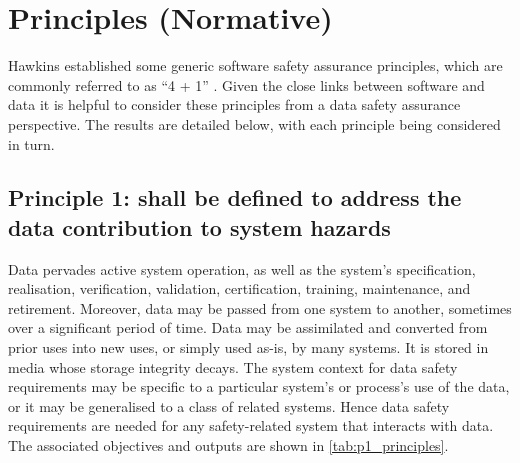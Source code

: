 %
%
\cbstart\chapter{Principles (Normative)} \label{bkm:principlesprocess}\cbend


Hawkins  established some generic software safety assurance principles, which are commonly referred to as ``4 + 1'' \cite{citation:hawkins2013principles}. Given the close links between software and data it is helpful to consider these principles from a data safety assurance perspective. The results are detailed below, with each principle being considered in turn.

\section{Principle 1:  shall be defined to address the data contribution to system hazards}
Data pervades active system operation, as well as the system's specification, realisation, \gls{verification}, \gls{validation}, certification,  training, maintenance, and retirement. Moreover, data may be passed from one system to another, sometimes over a significant period of time. Data may be assimilated and converted from prior uses into new uses, or simply used as-is, by many systems. It is stored in media whose storage \gls{integrity} decays. The system context for \glspl{data safety requirement} may be specific to a particular system's or process's use of the data, or it may be generalised to a class of related systems. Hence \glspl{data safety requirement} are needed for any safety-related system that interacts with data. The associated objectives and outputs are shown in \ref{tab:p1_principles}.

